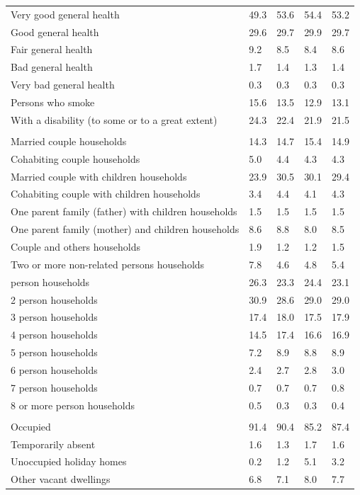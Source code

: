 \documentclass{article}
\begin{document}
\begin{table}[h]
\begin{tabular}{KTTTT}
    \hline
Very good general health & 49.3& 53.6&54.4& 53.2\\
Good general health & 29.6& 29.7& 29.9& 29.7\\
Fair general health & 9.2& 8.5&8.4& 8.6\\
Bad general health & 1.7& 1.4&1.3& 1.4\\
Very bad general health & 0.3& 0.3&0.3& 0.3\\
    \hline
Persons who smoke & 15.6& 13.5&12.9& 13.1\\
    \hline
With a disability (to some or to a great extent) & 24.3& 22.4&21.9& 21.5\\
\hline
    \\ 
    \hline
Married couple households & 14.3& 14.7& 15.4& 14.9\\
Cohabiting couple households & 5.0& 4.4& 4.3& 4.3\\
Married couple with children households & 23.9& 30.5& 30.1& 29.4\\
Cohabiting couple with children households & 3.4& 4.4& 4.1& 4.3\\
One parent family (father) with  children households & 1.5& 1.5& 1.5& 1.5\\
One parent family (mother) and children households & 8.6& 8.8& 8.0& 8.5\\
Couple and others households  & 1.9& 1.2& 1.2& 1.5\\
Two or more non-related persons households & 7.8& 4.6& 4.8& 5.4\\
     person households & 26.3& 23.3& 24.4& 23.1\\
2 person households & 30.9& 28.6& 29.0& 29.0\\
3 person households & 17.4& 18.0& 17.5& 17.9\\
4 person households & 14.5& 17.4& 16.6& 16.9\\
5 person households & 7.2& 8.9& 8.8& 8.9\\
6 person households & 2.4& 2.7& 2.8& 3.0\\
7 person households & 0.7& 0.7& 0.7& 0.8\\
8 or more person households & 0.5& 0.3& 0.3& 0.4\\
\hline
    \\ 
    \hline
Occupied & 91.4& 90.4& 85.2& 87.4\\
Temporarily absent & 1.6& 1.3& 1.7& 1.6\\
Unoccupied holiday homes & 0.2& 1.2& 5.1& 3.2\\
Other vacant dwellings & 6.8& 7.1& 8.0& 7.7\\
\hline
\end{tabular}
\end{table}
\end{document}
